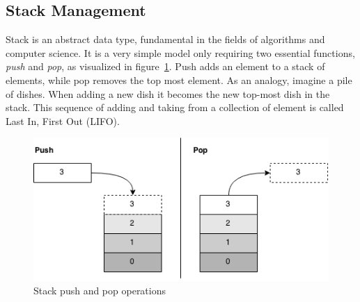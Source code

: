 \subsection{Stack Management}

Stack is an abstract data type, fundamental in the fields of algorithms and
computer science. It is a very simple model only requiring two essential
functions, {\it push} and {\it pop}, as visualized in
figure~\ref{fig:stack}. Push adds an element to a stack of elements, while pop
removes the top most element. As an analogy, imagine a pile of dishes. When
adding a new dish it becomes the new top-most dish in the stack. This sequence
of adding and taking from a collection of element is called Last In, First Out
(LIFO).
\begin{figure}[h]
  \centering
  \includegraphics[scale=0.6]{images/stack.png}
  \caption{Stack push and pop operations}
  \label{fig:stack}
\end{figure}


